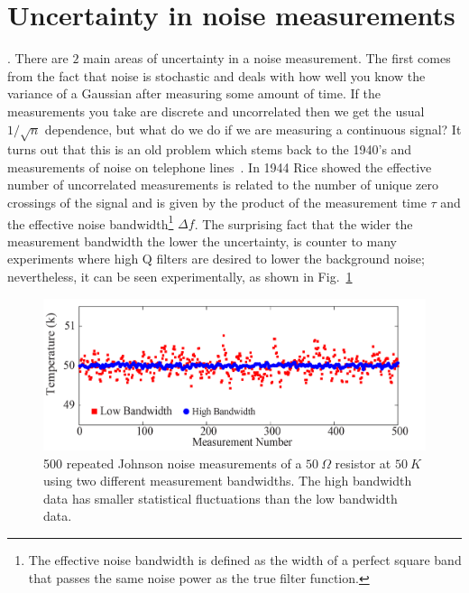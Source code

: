\section{Uncertainty in noise measurements}
. There are $2$ main areas of uncertainty in a noise measurement. The first comes from the fact that noise is stochastic and deals with how well you know the variance of a Gaussian after measuring some amount of time. If the measurements you take are discrete and uncorrelated then we get the usual $1/\sqrt{n}$ dependence, but what do we do if we are measuring a continuous signal? It turns out that this is an old problem which stems back to the 1940's and measurements of noise on telephone lines~\cite{rice_mathematical_1944}. In 1944 Rice showed the effective number of uncorrelated measurements is related to the number of unique zero crossings of the signal and is given by the product of the measurement time $\tau$ and the effective noise bandwidth\footnote{The effective noise bandwidth is defined as the width of a perfect square band that passes the same noise power as the true filter function.} $\Delta f$. The surprising fact that the wider the measurement bandwidth the lower the uncertainty, is counter to many experiments where high Q filters are desired to lower the background noise; nevertheless, it can be seen experimentally, as shown in Fig.~\ref{fig:JNT_500measurements}
\begin{figure}
\centering
\includegraphics[width=120mm]{figures/Johnson_noise_thermometry/500_measurements.png}
\caption{500 repeated Johnson noise measurements of a $50~\Omega$ resistor at $50~K$ using two different measurement bandwidths. The high bandwidth data has smaller statistical fluctuations than the low bandwidth data.}
\label{fig:JNT_500measurements}
\end{figure}

